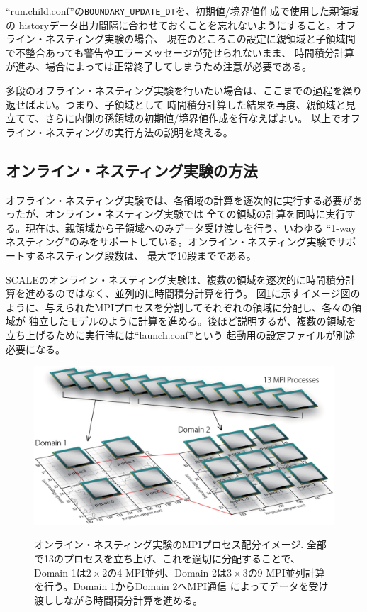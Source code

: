 \noindent ``run.child.conf''の\verb|BOUNDARY_UPDATE_DT|を、初期値/境界値作成で使用した親領域の
historyデータ出力間隔に合わせておくことを忘れないようにすること。オフライン・ネスティング実験の場合、
現在のところこの設定に親領域と子領域間で不整合あっても警告やエラーメッセージが発せられないまま、
時間積分計算が進み、場合によっては正常終了してしまうため注意が必要である。

多段のオフライン・ネスティング実験を行いたい場合は、ここまでの過程を繰り返せばよい。つまり、子領域として
時間積分計算した結果を再度、親領域と見立てて、さらに内側の孫領域の初期値/境界値作成を行なえばよい。
以上でオフライン・ネスティングの実行方法の説明を終える。


\subsection{オンライン・ネスティング実験の方法} \label{sec:nest_online}

オフライン・ネスティング実験では、各領域の計算を逐次的に実行する必要があったが、オンライン・ネスティング実験では
全ての領域の計算を同時に実行する。現在は、親領域から子領域へのみデータ受け渡しを行う、いわゆる
``1-wayネスティング''のみをサポートしている。オンライン・ネスティング実験でサポートするネスティング段数は、
最大で10段までである。

SCALEのオンライン・ネスティング実験は、複数の領域を逐次的に時間積分計算を進めるのではなく、並列的に時間積分計算を行う。
図\ref{fig_mpisplit}に示すイメージ図のように、与えられたMPIプロセスを分割してそれぞれの領域に分配し、各々の領域が
独立したモデルのように計算を進める。後ほど説明するが、複数の領域を立ち上げるために実行時には``launch.conf''という
起動用の設定ファイルが別途必要になる。

\begin{figure}[t]
\begin{center}
  \includegraphics[width=0.8\hsize]{./figure/mpisplit_nesting.eps}\\
  \caption{オンライン・ネスティング実験のMPIプロセス配分イメージ. 全部で13のプロセスを立ち上げ、これを適切に分配することで、
           Domain 1は$2 \times 2$の4-MPI並列、Domain 2は$3 \times 3$の9-MPI並列計算を行う。Domain 1からDomain 2へMPI通信
           によってデータを受け渡ししながら時間積分計算を進める。}
  \label{fig_mpisplit}
\end{center}
\end{figure}


